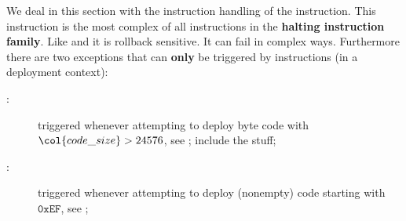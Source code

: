 We deal in this section with the instruction handling of the  instruction.
This instruction is the most complex of all instructions in the \textbf{halting instruction family}.
Like  and  it is rollback sensitive.
It can fail in complex ways.
Furthermore there are two exceptions that can \textbf{only} be triggered by  instructions (in a deployment context):
\begin{description}
	\item[\maxcsxSH{}:]
		triggered whenever attempting to deploy byte code with $ \col{code\_size} > 24576 $,
		see \cite{EIP-170};
		\specTodo{} include the  stuff;
	\item[\icpxSH{}:]
		triggered whenever attempting to deploy (nonempty) code starting with $\texttt{0xEF}$,
		see \cite{EIP-3541};
\end{description}
